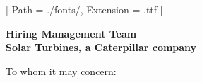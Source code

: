 


\renewcommand{\photo}[2]{}

\geometry{
  left=2cm,
  right=2cm,
  top=2cm,
  bottom=2cm
}



\makecvheader

\setmainfont{NotoSans-Regular}[
  Path = ./fonts/,
  Extension = .ttf
]

\vspace{1cm}
\indent\textbf{Hiring Management Team}\\
\indent\textbf{Solar Turbines, a Caterpillar company}

\vspace{0.5cm}

\noindent To whom it may concern:

\vspace{0.5cm}

